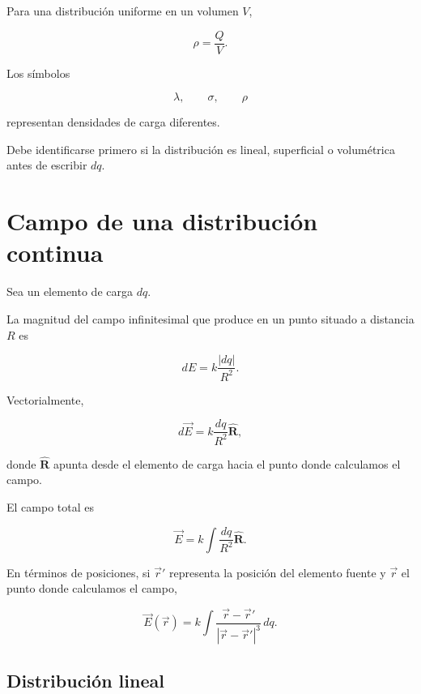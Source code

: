 Para una distribución uniforme en un volumen \(V\),

\[
\boxed{\rho=\frac{Q}{V}}.
\]

\begin{advertencia}

Los símbolos

\[
\lambda,\qquad\sigma,\qquad\rho
\]

representan densidades de carga diferentes.

Debe identificarse primero si la distribución es lineal, superficial o
volumétrica antes de escribir \(dq\).

\end{advertencia}


\section{Campo de una distribución continua}

Sea un elemento de carga \(dq\).

La magnitud del campo infinitesimal que produce en un punto situado a distancia
\(R\) es

\[
dE=k\frac{|dq|}{R^2}.
\]

Vectorialmente,

\begin{equation}
\boxed{d\vec E=k\frac{dq}{R^2}\hat{\mathbf R}},
\end{equation}

donde \(\hat{\mathbf R}\) apunta desde el elemento de carga hacia el punto donde
calculamos el campo.

El campo total es

\begin{equation}
\boxed{
\vec E
=
k\int\frac{dq}{R^2}\hat{\mathbf R}
}.
\label{eq:integral_campo_general}
\end{equation}

En términos de posiciones, si \(\vec r'\) representa la posición del elemento
fuente y \(\vec r\) el punto donde calculamos el campo,

\begin{equation}
\boxed{
\vec E(\vec r)
=
k\int
\frac{\vec r-\vec r'}
{|\vec r-\vec r'|^3}\,dq
}.
\label{eq:campo_continuo_vectorial}
\end{equation}


\subsection{Distribución lineal}


